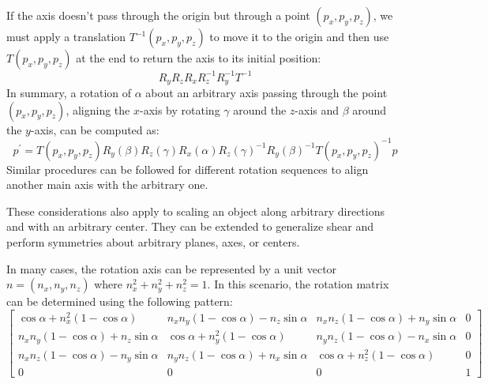 If the axis doesn't pass through the origin but through a point $(p_x,p_y,p_z)$, we must apply a translation $T^{-1}(p_x,p_y,p_z)$ to move it to the origin and then use $T(p_x,p_y,p_z)$ at the end to return the axis to its initial position:
\[R_yR_zR_xR_z^{-1}R_y^{-1}T^{-1}\]
In summary, a rotation of $\alpha$ about an arbitrary axis passing through the point $(p_x,p_y,p_z)$, aligning the $x$-axis by rotating $\gamma$ around the $z$-axis and $\beta$ around the $y$-axis, can be computed as:
\[p^\prime=T(p_x, p_y, p_z) R_y(\beta) R_z(\gamma) R_x(\alpha) R_z(\gamma)^{-1} R_y(\beta)^{-1} T(p_x, p_y, p_z)^{-1} p\]
Similar procedures can be followed for different rotation sequences to align another main axis with the arbitrary one.

These considerations also apply to scaling an object along arbitrary directions and with an arbitrary center. 
They can be extended to generalize shear and perform symmetries about arbitrary planes, axes, or centers.

In many cases, the rotation axis can be represented by a unit vector $n = (n_x, n_y, n_z)$ where $n_x^2 + n_y^2 + n_z^2 = 1$. 
In this scenario, the rotation matrix can be determined using the following pattern:
\[\begin{bmatrix}
    \cos\alpha + n_x^2\left( 1-\cos \alpha \right) & n_xn_y\left(1-\cos\alpha\right) -n_z\sin\alpha & n_xn_z\left(1-\cos\alpha\right) +n_y\sin\alpha & 0 \\
    n_xn_y\left(1-\cos\alpha\right) +n_z\sin\alpha & \cos \alpha + n_y^2\left( 1-\cos\alpha \right) & n_yn_z\left(1-\cos\alpha\right) -n_x\sin\alpha & 0 \\
    n_xn_z\left(1-\cos\alpha\right) -n_y\sin\alpha & n_yn_z\left(1-\cos\alpha\right) +n_x\sin\alpha & \cos\alpha + n_z^2\left( 1-\cos \alpha \right) & 0 \\
    0 & 0 & 0 & 1
\end{bmatrix} \]